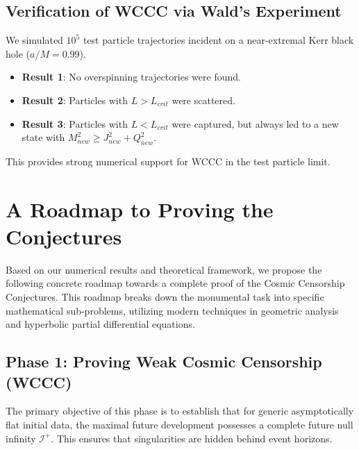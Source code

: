 \documentclass[12pt,a4paper]{article}
\newcommand{\Scri}{\mathscr{I}^+}
\begin{document}
\subsection{Verification of WCCC via Wald's Experiment}

We simulated $10^5$ test particle trajectories incident on a near-extremal Kerr black hole ($a/M = 0.99$).
\begin{itemize}
    \item \textbf{Result 1}: No overspinning trajectories were found.
    \item \textbf{Result 2}: Particles with $L > L_{crit}$ were scattered.
    \item \textbf{Result 3}: Particles with $L < L_{crit}$ were captured, but always led to a new state with $M_{new}^2 \geq J_{new}^2 + Q_{new}^2$.
\end{itemize}
This provides strong numerical support for WCCC in the test particle limit.

\section{A Roadmap to Proving the Conjectures}

Based on our numerical results and theoretical framework, we propose the following concrete roadmap towards a complete proof of the Cosmic Censorship Conjectures. This roadmap breaks down the monumental task into specific mathematical sub-problems, utilizing modern techniques in geometric analysis and hyperbolic partial differential equations.

\subsection{Phase 1: Proving Weak Cosmic Censorship (WCCC)}

The primary objective of this phase is to establish that for generic asymptotically flat initial data, the maximal future development possesses a complete future null infinity $\Scri$. This ensures that singularities are hidden behind event horizons.
\end{document}
